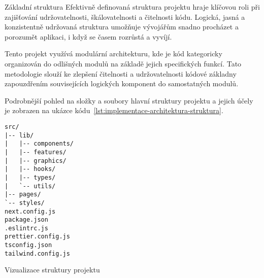 \begin{subsection}{Základní struktura}
    \label{subsec:implementace-architektura-struktura}
    Efektivně definovaná struktura projektu hraje klíčovou roli při zajišťování udržovatelnosti, škálovatelnosti a čitelnosti kódu.
    Logická, jasná a konzistentně udržovaná struktura umožňuje vývojářům snadno procházet a porozumět aplikaci, i když se  časem rozrůstá a vyvíjí.

    Tento projekt využívá modulární architekturu, kde je kód kategoricky organizován do odlišných modulů na základě jejich specifických funkcí.
    Tato metodologie slouží ke zlepšení čitelnosti a udržovatelnosti kódové základny zapouzdřením souvisejících logických komponent do samostatných modulů\cite{p_article_react_folder_structure}.

    Podrobnější pohled na složky a soubory hlavní struktury projektu a jejich účely je zobrazen na ukázce kódu~\ref{lst:implementace-architektura-struktura}.

    \begin{listing}[H]
        \begin{verbatim}
src/
|-- lib/
|   |-- components/
|   |-- features/
|   |-- graphics/
|   |-- hooks/
|   |-- types/
|   `-- utils/
|-- pages/
`-- styles/
next.config.js
package.json
.eslintrc.js
prettier.config.js
tsconfig.json
tailwind.config.js
        \end{verbatim}
        \caption{Vizualizace struktury projektu}
        \label{lst:implementace-architektura-struktura}
    \end{listing}


\end{subsection}

